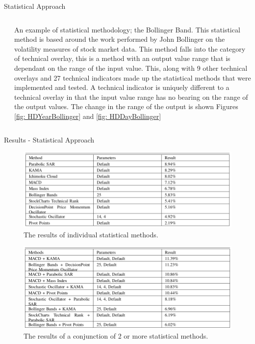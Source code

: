 \documentclass[final]{beamer}
\begin{document}
\begin{frame}{}
\begin{columns}[t]
\begin{column}{.48\linewidth}
\begin{block}{Statistical Approach}
\begin{columns}[t]
\begin{column}{0.48\linewidth}
         \end{column}
         
         \begin{column}{0.42\linewidth}
         
         An example of statistical methodology; the Bollinger Band. This statistical method is based around the work performed by John Bollinger on the volatility measures of stock market data. This method falls into the category of technical overlay, this is a method with an output value range that is dependant on the range of the input value. This, along with 9 other technical overlays and 27 technical indicators made up the statistical methods that were implemented and tested. A technical indicator is uniquely different to a technical overlay in that the input value range has no bearing on the range of the output values. The change in the range of the output is shown Figures \ref{fig: HDYearBollinger} and \ref{fig: HDDayBollinger}
         
         \end{column}
         
         \end{columns}

        \end{block}
        
        
         \begin{block}{Results - Statistical Approach}
         
		 \begin{figure}
         \includegraphics[width=0.8\columnwidth]{table1}
         \caption{The results of individual statistical methods.}
         \label{table: Individual Results}
         \end{figure}
         
         \begin{figure}
         \includegraphics[width=0.8\columnwidth]{table2}
         \caption{The results of a conjunction of 2 or more statistical methods.}
         \label{table: Conjunction Results}
         \end{figure}


\end{block}
\end{column}
\end{columns}
\end{frame}
\end{document}

